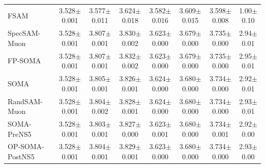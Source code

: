 \begin{table}[t]
{\begin{tabular}{lccccccc}
    FSAM & 3.528{\scriptsize$\pm$0.001} & 3.577{\scriptsize$\pm$0.011} & 3.624{\scriptsize$\pm$0.018} & 3.582{\scriptsize$\pm$0.016} & 3.609{\scriptsize$\pm$0.015} & 3.598{\scriptsize$\pm$0.008} & 1.00{\scriptsize$\pm$0.10} \\
    SpecSAM-Muon & 3.528{\scriptsize$\pm$0.001} & 3.807{\scriptsize$\pm$0.001} & 3.830{\scriptsize$\pm$0.002} & 3.623{\scriptsize$\pm$0.000} & 3.679{\scriptsize$\pm$0.000} & 3.735{\scriptsize$\pm$0.000} & 2.94{\scriptsize$\pm$0.01} \\
    FP-SOMA & 3.528{\scriptsize$\pm$0.001} & 3.807{\scriptsize$\pm$0.001} & 3.832{\scriptsize$\pm$0.002} & 3.623{\scriptsize$\pm$0.000} & 3.679{\scriptsize$\pm$0.000} & 3.735{\scriptsize$\pm$0.000} & 2.95{\scriptsize$\pm$0.01} \\
    SOMA & 3.528{\scriptsize$\pm$0.001} & 3.805{\scriptsize$\pm$0.001} & 3.826{\scriptsize$\pm$0.001} & 3.624{\scriptsize$\pm$0.000} & 3.680{\scriptsize$\pm$0.000} & 3.734{\scriptsize$\pm$0.000} & 2.92{\scriptsize$\pm$0.01} \\
    RandSAM-Muon & 3.528{\scriptsize$\pm$0.001} & 3.804{\scriptsize$\pm$0.002} & 3.828{\scriptsize$\pm$0.001} & 3.624{\scriptsize$\pm$0.000} & 3.680{\scriptsize$\pm$0.000} & 3.734{\scriptsize$\pm$0.000} & 2.93{\scriptsize$\pm$0.01} \\
    SOMA-PreNS5 & 3.528{\scriptsize$\pm$0.001} & 3.803{\scriptsize$\pm$0.001} & 3.827{\scriptsize$\pm$0.000} & 3.623{\scriptsize$\pm$0.001} & 3.680{\scriptsize$\pm$0.000} & 3.734{\scriptsize$\pm$0.001} & 2.92{\scriptsize$\pm$0.00} \\
    OP-SOMA-PostNS5 & 3.528{\scriptsize$\pm$0.001} & 3.804{\scriptsize$\pm$0.001} & 3.829{\scriptsize$\pm$0.001} & 3.623{\scriptsize$\pm$0.000} & 3.680{\scriptsize$\pm$0.000} & 3.734{\scriptsize$\pm$0.000} & 2.93{\scriptsize$\pm$0.00} \\
    \bottomrule
  \end{tabular}}
\end{table}
